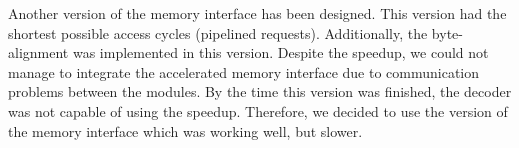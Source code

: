 Another version of the memory interface has been designed. This version had the shortest possible access cycles (pipelined requests). Additionally, the byte-alignment was implemented in this version. Despite the speedup, we could not manage to integrate the accelerated memory interface due to communication problems between the modules. By the time this version was finished, the decoder was not capable of using the speedup. Therefore, we decided to use the version of the memory interface which was working well, but slower.